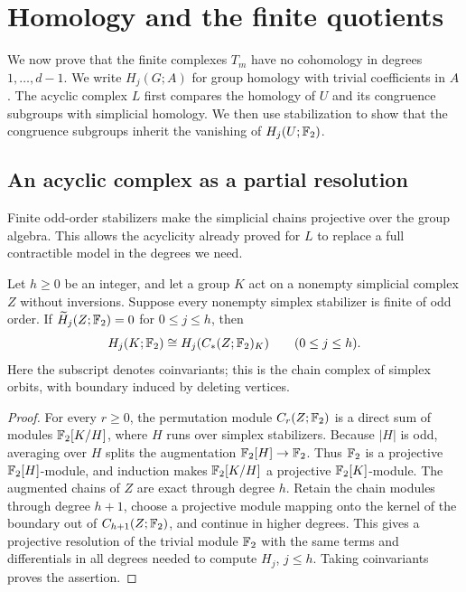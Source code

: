 \section{Homology and the finite quotients}
\label{sec:homology}

We now prove that the finite complexes $T_m$ have no cohomology in
degrees $1,\ldots,d-1$. We write $H_j(G;A)$ for group homology with
trivial coefficients in $A$. The acyclic complex $L$ first compares
the homology of $U$ and its congruence subgroups with simplicial homology.
We then use stabilization to show that the congruence subgroups inherit
the vanishing of $H_j(U;\mathbb F_2)$.

\subsection{An acyclic complex as a partial resolution}
\label{subsec:projective-resolution}

Finite odd-order stabilizers make the simplicial chains projective over
the group algebra. This allows the acyclicity already proved for $L$
to replace a full contractible model in the degrees we need.

\begin{lemma}\label{lem:projective-chains}
Let $h\ge0$ be an integer, and let a group $K$ act on a nonempty
simplicial complex $Z$ without inversions. Suppose every nonempty
simplex stabilizer is finite of odd order.
If $\widetilde H_j(Z;\mathbb F_2)=0$ for $0\le j\le h$, then
\[
 H_j(K;\mathbb F_2)\cong H_j(C_*(Z;\mathbb F_2)_K)\qquad(0\le j\le h).
\]
Here the subscript denotes coinvariants; this is the chain complex of
simplex orbits, with boundary induced by deleting vertices.
\end{lemma}

\begin{proof}
For every $r\ge0$, the permutation module $C_r(Z;\mathbb F_2)$ is a direct sum
of modules $\mathbb F_2[K/H]$, where $H$ runs over simplex stabilizers. Because
$|H|$ is odd, averaging over $H$ splits the augmentation
$\mathbb F_2[H]\to\mathbb F_2$. Thus $\mathbb F_2$ is a projective $\mathbb F_2[H]$-module, and induction
makes $\mathbb F_2[K/H]$ a projective $\mathbb F_2[K]$-module.
The augmented chains of $Z$ are exact through degree $h$. Retain the
chain modules through degree $h+1$, choose a projective module mapping
onto the kernel of the boundary out of $C_{h+1}(Z;\mathbb F_2)$, and continue
in higher degrees. This gives a
projective resolution of the trivial module $\mathbb F_2$ with the same terms
and differentials in all degrees needed to compute $H_j$, $j\le h$.
Taking coinvariants proves the assertion.
\end{proof}

